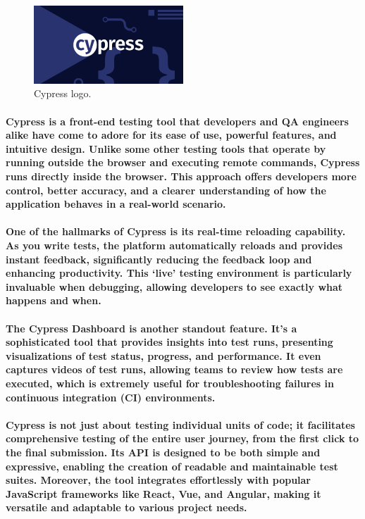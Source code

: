 \documentclass[12pt,a4paper]{article}
\begin{document}
    \begin{figure}[h!]
      \centering
      \includegraphics[width=0.5\textwidth]{cypress.png}
      \caption{Cypress logo.}
    \end{figure}

    \paragraph{Cypress is a front-end testing tool that developers and QA engineers alike have come to adore for its ease of use, powerful features, and intuitive design. Unlike some other testing tools that operate by running outside the browser and executing remote commands, Cypress runs directly inside the browser. This approach offers developers more control, better accuracy, and a clearer understanding of how the application behaves in a real-world scenario.}

    \paragraph{One of the hallmarks of Cypress is its real-time reloading capability. As you write tests, the platform automatically reloads and provides instant feedback, significantly reducing the feedback loop and enhancing productivity. This ‘live’ testing environment is particularly invaluable when debugging, allowing developers to see exactly what happens and when.}
    
    \paragraph{The Cypress Dashboard is another standout feature. It’s a sophisticated tool that provides insights into test runs, presenting visualizations of test status, progress, and performance. It even captures videos of test runs, allowing teams to review how tests are executed, which is extremely useful for troubleshooting failures in continuous integration (CI) environments.}
    
    \paragraph{Cypress is not just about testing individual units of code; it facilitates comprehensive testing of the entire user journey, from the first click to the final submission. Its API is designed to be both simple and expressive, enabling the creation of readable and maintainable test suites. Moreover, the tool integrates effortlessly with popular JavaScript frameworks like React, Vue, and Angular, making it versatile and adaptable to various project needs.}
\end{document}

